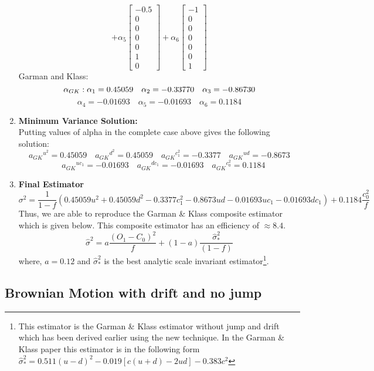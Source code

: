 \documentclass[12pt]{article}   	%
\begin{document}
\begin{enumerate}
$$+\alpha_5
\begin{bmatrix}
-0.5\\
0\\
0\\
0\\
0\\
1\\
0
\end{bmatrix}
+\alpha_6
\begin{bmatrix}
-1\\
0\\
0\\
0\\
0\\
0\\
1
\end{bmatrix}
 $$
Garman and Klass:\quad $$\alpha_{GK}: \alpha_1=0.45059\quad \alpha_2=-0.33770\quad \alpha_3=-0.86730 \quad\\$$ $$
 \alpha_4=-0.01693\quad \alpha_5=-0.01693 \quad \alpha_6=0.1184$$ 
 
\item \textbf{Minimum Variance Solution:}\\
Putting values of alpha in the complete case above gives the following solution:\\
$${a_{GK}}^{u^2}=0.45059\quad{a_{GK}}^{d^2}=0.45059\quad{a_{GK}}^{c_1^2}= -0.3377\quad{a_{GK}}^{ud}=-0.8673$$
$$\quad{a_{GK}}^{uc_1}=-0.01693\quad{a_{GK}}^{dc_1}=-0.01693\quad{a_{GK}}^{c_0^2}=0.1184$$

\item \textbf{Final Estimator}\\
$$\sigma^{2}= \frac{1}{1-f}(0.45059{u^2}+0.45059d^2-0.3377c_{1}^2-0.8673ud-0.01693uc_{1}-0.01693dc_{1})+ 0.1184\frac{c_{0}^2}{f}$$
Thus, we are able to reproduce the Garman \& Klass composite estimator which is given below. This composite estimator has an efficiency of $\approx 8.4.$
$$\hat{\sigma}^2=a\frac{(O_1-C_0)^2}{f}+(1-a)\frac{\hat{\sigma}_*^2}{(1-f)}
$$
where, $a=0.12$ and $\hat{\sigma}_*^2$ is the best analytic scale invariant estimator\footnote{This estimator is the Garman \& Klass estimator without jump and drift which has been derived earlier using the new technique. In the Garman \& Klass paper this estimator is in the following form $\hat{\sigma}_*^2 = 0.511(u-d)^2-0.019[c(u+d)-2ud]-0.383c^2$}. 
\end{enumerate}

\subsection{Brownian Motion with drift and no jump}
\end{document}
